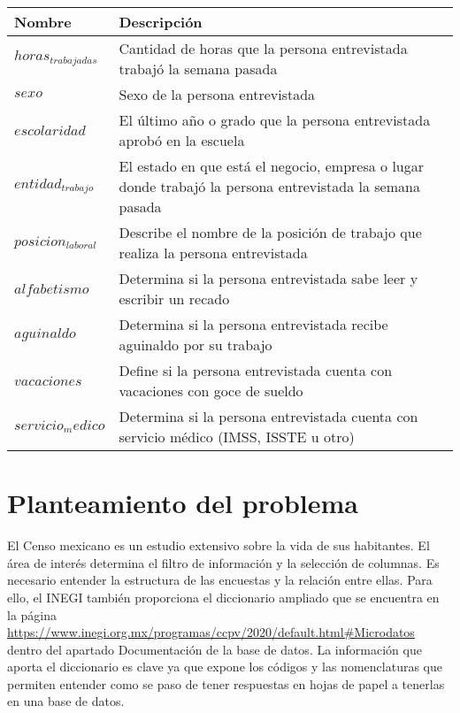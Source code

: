 \begin{center}
	\begin{tabular}{|p{3cm}|p{6.5cm}|} 
		\hline
		Nombre & Descripción \\ 
		\hline 
		$horas_{trabajadas}$ & Cantidad de horas que la persona entrevistada trabajó la semana pasada \\ 
		\hline
		$sexo$ & Sexo de la persona entrevistada \\ 
		\hline
		$escolaridad$ & El último año o grado que la persona entrevistada aprobó en la escuela \\ 
		\hline
		$entidad_{trabajo}$ & El estado en que está el negocio, empresa o lugar donde trabajó la persona entrevistada la semana pasada \\
		\hline
		$posicion_{laboral}$ & Describe el nombre de la posición de trabajo que realiza la persona entrevistada \\
		\hline
		$alfabetismo$ & Determina si la persona entrevistada sabe leer y escribir un recado \\
		\hline
		$aguinaldo$ & Determina si la persona entrevistada recibe aguinaldo por su trabajo \\
		\hline
		$vacaciones$ & Define si la persona entrevistada cuenta con vacaciones con goce de sueldo \\
		\hline
		$servicio_medico$ & Determina si la persona entrevistada cuenta con servicio médico (IMSS, ISSTE u otro) \\
		\hline
	\end{tabular} 
	 \label{regresores_mod_desc}
\end{center}



\section{Planteamiento del problema}
El Censo mexicano es un estudio extensivo sobre la vida de sus habitantes. El área de interés determina el filtro de información y la selección de columnas. Es necesario entender la estructura de las encuestas y la relación entre ellas. Para ello, el INEGI también proporciona el diccionario ampliado que se encuentra en la página \url{https://www.inegi.org.mx/programas/ccpv/2020/default.html#Microdatos} dentro del apartado \textsf{Documentación de la base de datos}. La información que aporta el diccionario es clave ya que expone los códigos y las nomenclaturas que permiten entender como se paso de tener respuestas en hojas de papel a tenerlas en una base de datos.


